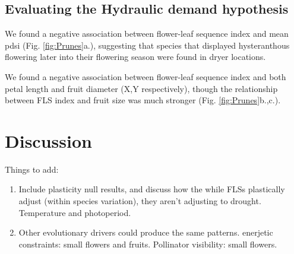 \documentclass{article}[11pt]
\begin{document}
\subsection*{Evaluating the Hydraulic demand hypothesis}
We found a negative association between flower-leaf sequence index and mean pdsi (Fig. \ref{fig:Prunes}a.), suggesting that species that displayed hysteranthous flowering later into their flowering season were found in dryer locations. 

We found a negative association between flower-leaf sequence index and both  petal length and fruit diameter (X,Y respectively), though the relationship between FLS index and fruit size was much stronger (Fig. \ref{fig:Prunes}b.,c.).





\section*{Discussion}
Things to add:\\
\begin{enumerate}
\item Include plasticity null results, and discuss how the while FLSs plastically adjust (within species variation), they aren't adjusting to drought. Temperature and photoperiod.
\item Other evolutionary drivers could produce the same patterns. enerjetic constraints: small flowers and fruits. Pollinator visibility: small flowers.
\end{enumerate}
\end{document}
